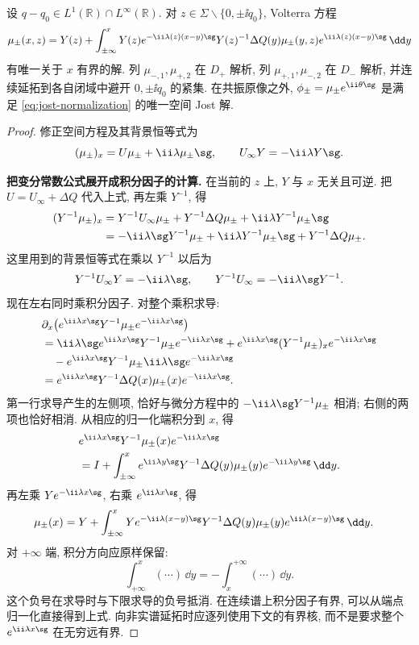 \begin{theorem}\label{thm:jost}
设 $q-q_0\in L^1(\mathbb R)\cap L^\infty(\mathbb R)$. 对 $z\in\Sigma\mathbin{\backslash}\{0,\pm\ii q_0\}$, Volterra 方程
\begin{equation}\label{eq:volterra}
\mu_\pm(x,z)=Y(z)+\int_{\pm\infty}^{x}
Y(z)e^{-\ii\lambda(z)(x-y)\sg}Y(z)^{-1}
\Delta Q(y)\mu_\pm(y,z)e^{\ii\lambda(z)(x-y)\sg}\,\dd y
\end{equation}
有唯一关于 $x$ 有界的解. 列 $\mu_{-,1},\mu_{+,2}$ 在 $D_+$ 解析, 列 $\mu_{+,1},\mu_{-,2}$ 在 $D_-$ 解析, 并连续延拓到各自闭域中避开 $0,\pm\ii q_0$ 的紧集. 在共振原像之外, $\phi_\pm=\mu_\pm e^{\ii\theta\sg}$ 是满足 \eqref{eq:jost-normalization} 的唯一空间 Jost 解.
\end{theorem}
\begin{proof}
修正空间方程及其背景恒等式为
\[
(\mu_\pm)_x=U\mu_\pm+\ii\lambda\mu_\pm\sg,\qquad U_\infty Y=-\ii\lambda Y\sg.
\]

\par\medskip\noindent\textbf{把变分常数公式展开成积分因子的计算.}\quad 
在当前的 $z$ 上, $Y$ 与 $x$ 无关且可逆. 把
$U=U_\infty+\Delta Q$ 代入上式, 再左乘 $Y^{-1}$, 得
\begin{align*}
(Y^{-1}\mu_\pm)_x
&=Y^{-1}U_\infty\mu_\pm
+Y^{-1}\Delta Q\mu_\pm
+\ii\lambda Y^{-1}\mu_\pm\sg\\
&=-\ii\lambda\sg Y^{-1}\mu_\pm
+\ii\lambda Y^{-1}\mu_\pm\sg
+Y^{-1}\Delta Q\mu_\pm.
\end{align*}
这里用到的背景恒等式在乘以 $Y^{-1}$ 以后为
\[
Y^{-1}U_\infty Y=-\ii\lambda\sg,
\qquad
Y^{-1}U_\infty=-\ii\lambda\sg Y^{-1}.
\]
现在左右同时乘积分因子. 对整个乘积求导:
\begin{align*}
&\partial_x\bigl(e^{\ii\lambda x\sg}Y^{-1}\mu_\pm
 e^{-\ii\lambda x\sg}\bigr)\\
&=\ii\lambda\sg e^{\ii\lambda x\sg}Y^{-1}\mu_\pm
 e^{-\ii\lambda x\sg}
+e^{\ii\lambda x\sg}(Y^{-1}\mu_\pm)_x
 e^{-\ii\lambda x\sg}\\
&\quad-e^{\ii\lambda x\sg}Y^{-1}\mu_\pm
 \ii\lambda\sg e^{-\ii\lambda x\sg}\\
&=e^{\ii\lambda x\sg}Y^{-1}\Delta Q(x)\mu_\pm(x)
 e^{-\ii\lambda x\sg}.
\end{align*}
第一行求导产生的左侧项, 恰好与微分方程中的
$-\ii\lambda\sg Y^{-1}\mu_\pm$ 相消;
右侧的两项也恰好相消. 从相应的归一化端积分到 $x$, 得
\begin{align*}
&e^{\ii\lambda x\sg}Y^{-1}\mu_\pm(x)e^{-\ii\lambda x\sg}\\
&=I+\int_{\pm\infty}^{x}
 e^{\ii\lambda y\sg}Y^{-1}\Delta Q(y)\mu_\pm(y)
 e^{-\ii\lambda y\sg}\,\dd y.
\end{align*}
再左乘 $Ye^{-\ii\lambda x\sg}$, 右乘
$e^{\ii\lambda x\sg}$, 得
\begin{align*}
\mu_\pm(x)
&=Y+\int_{\pm\infty}^{x}
 Ye^{-\ii\lambda(x-y)\sg}Y^{-1}
 \Delta Q(y)\mu_\pm(y)e^{\ii\lambda(x-y)\sg}\,\dd y.
\end{align*}
对 $+\infty$ 端, 积分方向应原样保留:
\[
\int_{+\infty}^{x}(\cdots)\,\dd y
=-\int_x^{+\infty}(\cdots)\,\dd y.
\]
这个负号在求导时与下限求导的负号抵消.
在连续谱上积分因子有界, 可以从端点归一化直接得到上式.
向非实谱延拓时应逐列使用下文的有界核, 而不是要求整个
$e^{\ii\lambda x\sg}$ 在无穷远有界.


\end{proof}
